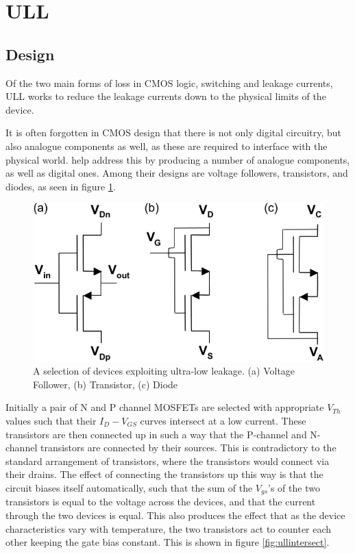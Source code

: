 \section{\acf{ULL}}
\label{sec:ull}

\subsection{Design}

Of the two main forms of loss in CMOS logic, switching and leakage currents, \ac{ULL} works to reduce the leakage currents down to the physical limits of the device.

It is often forgotten in CMOS design that there is not only digital circuitry, but also analogue components as well, as these are required to interface with the physical world.
\citeauthor{ULL-AandD} help address this by producing a number of analogue components, as well as digital ones.
Among their designs are voltage followers, transistors, and diodes, as seen in figure \ref{fig:ulldevices}.

\begin{figure}
	\centering
	\includegraphics[width=\columnwidth]{../../images/ULLdevices.png}
	\caption{A selection of devices exploiting ultra-low leakage. (a) Voltage Follower, (b) Transistor, (c) Diode \cite{DisruptiveULL}}
	\label{fig:ulldevices}
\end{figure}

Initially a pair of N and P channel MOSFETs are selected with appropriate $V_{Th}$ values such that their $I_{D}-V_{GS}$ curves intersect at a low current.
These transistors are then connected up in such a way that the P-channel and N-channel transistors are connected by their sources.
This is contradictory to the standard arrangement of transistors, where the transistors would connect via their drains.
The effect of connecting the transistors up this way is that the circuit biases itself automatically, such that the sum of the $V_{gs}$'s of the two transistors is equal to the voltage across the devices, and that the current through the two devices is equal.
This also produces the effect that as the device characteristics vary with temperature, the two transistors act to counter each other keeping the gate bias constant.
This is shown in figure \ref{fig:ullintersect}.

